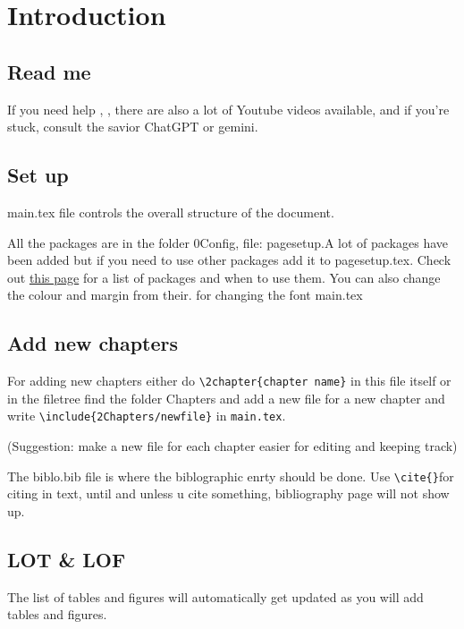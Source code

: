 
\chapter{Introduction}

\section{Read me}
If you need help \cite{lshort}, \cite{leesmiller2020latex}, there are also a lot of Youtube videos available, and if you're stuck, consult the savior ChatGPT or gemini.

\section{Set up}
main.tex file controls the overall structure of the document.

\noindent All the packages are in the folder 0Config, file: pagesetup.A lot of packages have been added but if you need to use other packages add it to pagesetup.tex. Check out 
\href{https://www.math.cmu.edu/~fabbri/latex/packages.htm}{this page} for a list of packages and when to use them. You can also change the colour and margin from their. for changing the font main.tex

\section{Add new chapters}
For adding new chapters either do \texttt{\textbackslash 2chapter\{chapter name\}}
in this file itself or in the filetree find the folder Chapters and add a new file for a new chapter and write \texttt{\textbackslash include\{2Chapters/newfile\}} in \texttt{main.tex}.

(Suggestion: make a new file for each chapter easier for editing and keeping track)

\noindent 
The biblo.bib file is where the biblographic enrty should be done. Use \texttt{\textbackslash cite\{\}}for citing in text, until and unless u cite something, bibliography page will not show up.

\section{LOT \& LOF}
The list of tables and figures will automatically get updated as you will add tables and figures.